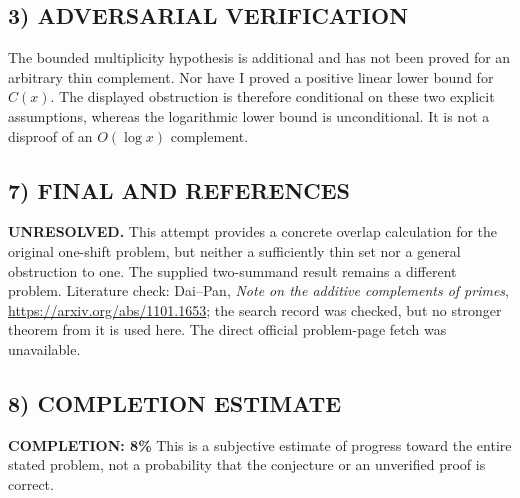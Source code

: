 \subsection*{3) ADVERSARIAL VERIFICATION}
The bounded multiplicity hypothesis is additional and has not been proved
for an arbitrary thin complement. Nor have I proved a positive linear lower
bound for $C(x)$. The displayed obstruction is therefore conditional on
these two explicit assumptions, whereas the logarithmic lower bound is
unconditional. It is not a disproof of an $O(\log x)$ complement.

\subsection*{7) FINAL AND REFERENCES}
\textbf{UNRESOLVED.} This attempt provides a concrete overlap calculation
for the original one-shift problem, but neither a sufficiently thin set nor
a general obstruction to one. The supplied two-summand result remains a
different problem. Literature check: Dai--Pan, \emph{Note on the additive
complements of primes}, \url{https://arxiv.org/abs/1101.1653}; the search
record was checked, but no stronger theorem from it is used here.
The direct official problem-page fetch was unavailable.

\subsection*{8) COMPLETION ESTIMATE}
\textbf{COMPLETION: 8\%}
This is a subjective estimate of progress toward the entire stated problem, not a probability that the conjecture or an unverified proof is correct.
